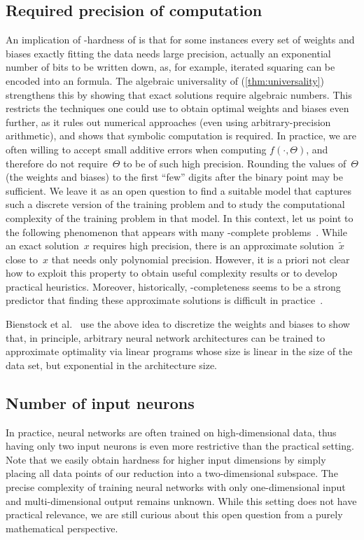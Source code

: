 \documentclass{toc}
\begin{document}
\subsection{Required precision of computation}
An implication of \ER-hardness of \trainNN is that for some instances every set of 
weights and biases 
exactly fitting the data %
%
needs large precision, actually %
%
an exponential
%
number of bits to be written down,
%
as, for example, iterated squaring can be encoded into an \ETR formula.
%
%
%
%
The algebraic universality of \trainNN (\cref{thm:universality}) strengthens this
by showing that exact solutions require algebraic numbers.
This restricts the techniques one could use to obtain optimal weights and biases even further,
as it rules out numerical approaches (even using arbitrary-precision arithmetic), and shows
that symbolic computation is required.
In practice, we are often willing to accept small additive errors when computing $f(\cdot, \Theta)$,
and therefore do not require~$\Theta$ %
to be %
of such high precision.
Rounding %
the values of~$\Theta$ (the weights and biases) %
to the first \enquote{few} digits after the %
%
binary point  %
may be sufficient.
%
%
%
%
%
%
%
%
%
%
%
%
%
%
We leave it as an open question to find a suitable model that captures such a discrete version of the training problem and to study the computational complexity of the training problem in that model. In this context, let us point to the following phenomenon that appears with many \ER-complete problems~\cite{Erickson2022_SmoothingTheGap}.
%
%
While an exact solution~$x$ requires high precision, there is an approximate solution~$\tilde{x}$
close to~$x$ that needs only polynomial precision.
However, %
%
it is a priori not clear how to exploit this property to obtain useful complexity results or to develop practical heuristics.
%
%
%
%
%
%
%
%
%
%
Moreover, historically, \ER-completeness seems to be a strong predictor that finding these approximate solutions is difficult in practice~\cite{Deligkas2022_ApproximatingETR, Erickson2022_SmoothingTheGap}.

Bienstock et al.~\cite{Bienstock2023_LinearProgramming} use the above idea to discretize the weights and biases to show that, in principle, arbitrary neural network architectures can be trained to approximate optimality via linear programs whose
%
size is %
linear in the size of the data set, but exponential in the architecture size.
%
%
%
%
%
%
%
%
%

\subsection{Number of input neurons}
In practice, neural networks are often trained on 
%
high-dimensional  %
data, thus having only two input neurons is even more restrictive than the practical setting.
Note that we easily obtain hardness for higher input dimensions by simply placing all data points of our reduction into a two-dimensional subspace.
The precise complexity of training \fullyconnected \twolayer neural networks with only one-dimensional input and multi-dimensional output remains unknown.
While this setting does not have practical relevance, we are still curious about this open question from a purely mathematical perspective.
\end{document}
